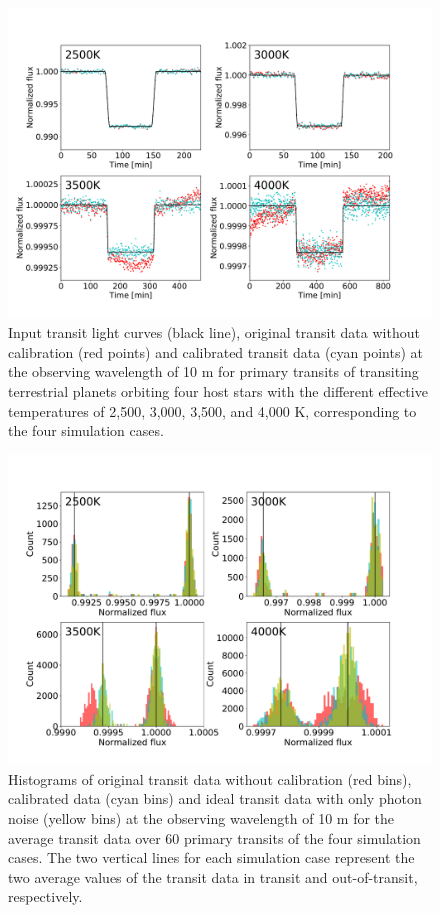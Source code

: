 \documentclass{aastex62}
\begin{document}
\begin{figure}[H]
\begin{center}
\includegraphics[width=12.5cm]{transit_curve.pdf}
\caption{Input transit light curves (black line), original transit data without calibration (red points) and calibrated transit data (cyan points) at the observing wavelength of 10 \textmu m for primary transits of transiting terrestrial planets orbiting four host stars with the different effective temperatures of 2,500, 3,000, 3,500, and 4,000 K, corresponding to the four simulation cases. \label{fig:transit_curve}}
\end{center}
\end{figure}

\begin{figure}[H]
\begin{center}
\includegraphics[width=12.5cm]{histogram_binned.pdf}
\caption{Histograms of original transit data without calibration (red bins), calibrated data (cyan bins) and ideal transit data with only photon noise (yellow bins) at the observing wavelength of 10 \textmu m for the average transit data over 60 primary transits of the four simulation cases. The two vertical lines for each simulation case represent the two average values of the transit data in transit and out-of-transit, respectively. \label{fig:histogram_binned}}
\end{center}
\end{figure}
\end{document}
